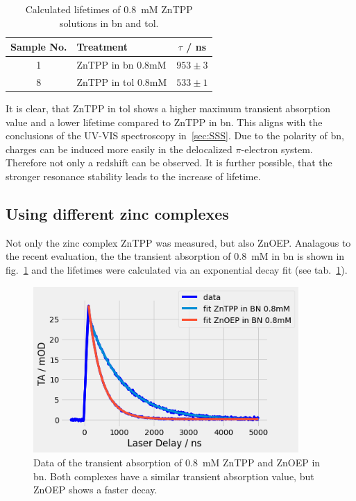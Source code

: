 \begin{table}[ht]
    \centering
    \begin{tabular}{clc}
        \toprule
        Sample No. &    Treatment &    $\tau$ / \si{\nano\second} \\
        \midrule
        1 &     ZnTPP in bn 0.8mM &  $953 \pm 3$ \\
        8 &    ZnTPP in tol 0.8mM &  $533 \pm 1$ \\
        \bottomrule
    \end{tabular}
    \caption{Calculated lifetimes of \SI{0.8}{\milli\nauticalmile} ZnTPP solutions in bn and tol.}
    \label{tab:ZnTPP-bn-tol}
\end{table}

It is clear, that ZnTPP in tol shows a higher maximum transient absorption value and a lower lifetime compared to ZnTPP in bn. This aligns with the conclusions of the UV-VIS spectroscopy in~\ref{sec:SSS}. Due to the polarity of bn, charges can be induced more easily in the delocalized $\pi$-electron system. Therefore not only a redshift can be observed. It is further possible, that the stronger resonance stability leads to the increase of lifetime.

\subsection*{Using different zinc complexes}
Not only the zinc complex ZnTPP was measured, but also ZnOEP. Analagous to the recent evaluation, the the transient absorption of \SI{0.8}{\milli\nauticalmile} in bn is shown in fig.~\ref{fig:ZnTPP-ZnOEP} and the lifetimes were calculated via an exponential decay fit (see tab.~\ref{fig:ZnTPP-ZnOEP}).

\begin{figure}[h]
    \centering
    \includegraphics[width = 0.9\textwidth]{Bilder/Auswertung/TRAS/ZnTPP-ZnOEP.png}
    \caption{Data of the transient absorption of \SI{0.8}{\milli\nauticalmile} ZnTPP and ZnOEP in bn. Both complexes have a similar transient absorption value, but ZnOEP shows a faster decay.}
    \label{fig:ZnTPP-ZnOEP}
\end{figure}


